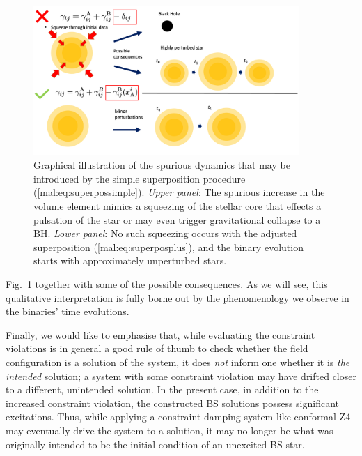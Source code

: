 \begin{figure}[t]
    \centering
    \includegraphics[width=0.9\textwidth]{malaise_source/BosonStarTrick.png}
    \caption{
    Graphical illustration of the spurious dynamics that
    may be introduced by the simple superposition
    procedure (\ref{mal:eq:superpossimple}). {\it Upper panel}:
    The spurious
    increase in the volume element mimics a squeezing of the
    stellar core that effects a pulsation of the star or
    may even trigger gravitational collapse to a BH.
    {\it Lower panel}: No such squeezing occurs with the
    adjusted superposition (\ref{mal:eq:superposplus}),
    and the binary evolution starts with approximately
    unperturbed stars.
    }
    \label{mal:fig:Overview}
\end{figure}
%
Fig.~\ref{mal:fig:Overview} together with some of the possible
consequences.
As we will see, this qualitative interpretation is fully borne out
by the phenomenology we observe in the binaries' time evolutions.

Finally, we would like to emphasise that, while evaluating the constraint violations is in general a good rule of thumb to check whether the field configuration is a solution of the system, it does \emph{not} inform one whether it is \emph{the intended} solution; a system with some constraint violation may have drifted closer to a different, unintended solution. In the present case, in addition to the  increased constraint violation, the constructed BS solutions possess significant excitations. Thus, while applying a constraint damping system like conformal Z4
\cite{Bernuzzi:2009ex,Alic:2011gg}
may eventually drive the system to a solution, it may no longer be what was originally intended to be the initial condition of an unexcited BS star.


